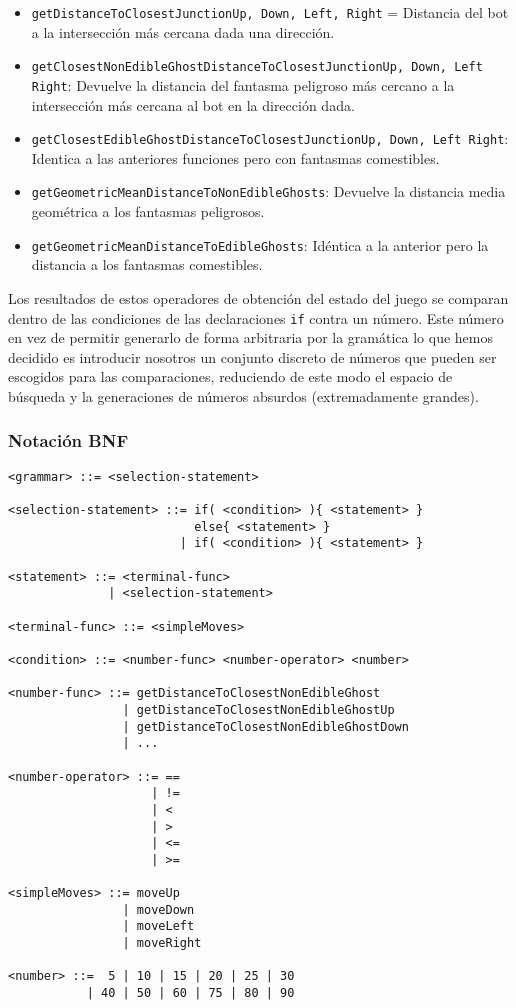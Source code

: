 \begin{itemize}
\item \texttt{getDistanceToClosestJunction{Up, Down, Left, Right}} = Distancia del bot a la intersección más cercana dada una dirección.

\item \texttt{getClosestNonEdibleGhostDistanceToClosestJunction{Up, Down, Left Right}}: Devuelve la distancia del fantasma peligroso más cercano a la intersección más cercana al bot en la dirección dada.

\item \texttt{getClosestEdibleGhostDistanceToClosestJunction{Up, Down, Left Right}}: Identica a las anteriores funciones pero con fantasmas comestibles.

\item \texttt{getGeometricMeanDistanceToNonEdibleGhosts}: Devuelve la distancia media geométrica a los fantasmas peligrosos.

\item \texttt{getGeometricMeanDistanceToEdibleGhosts}: Idéntica a la anterior pero la distancia a los fantasmas comestibles.
\end{itemize}

Los resultados de estos operadores de obtención del estado del juego se comparan dentro de las condiciones de las declaraciones \texttt{if} contra un número. Este número en vez de permitir generarlo de forma arbitraria por la gramática lo que hemos decidido es introducir nosotros un conjunto discreto de números que pueden ser escogidos para las comparaciones, reduciendo de este modo el espacio de búsqueda y la generaciones de números absurdos (extremadamente grandes).

\subsubsection{Notación BNF}
\begin{lstlisting}[caption={Gramática de bajo nivel.}]
<grammar> ::= <selection-statement>
 
<selection-statement> ::= if( <condition> ){ <statement> }
                          else{ <statement> }
                        | if( <condition> ){ <statement> }
 
<statement> ::= <terminal-func>
              | <selection-statement>
 
<terminal-func> ::= <simpleMoves>
 
<condition> ::= <number-func> <number-operator> <number>
 
<number-func> ::= getDistanceToClosestNonEdibleGhost
                | getDistanceToClosestNonEdibleGhostUp
                | getDistanceToClosestNonEdibleGhostDown
                | ... 
 
<number-operator> ::= ==
                    | !=
                    | <
                    | >
                    | <=
                    | >=
 
<simpleMoves> ::= moveUp
                | moveDown
                | moveLeft
                | moveRight
 
<number> ::=  5 | 10 | 15 | 20 | 25 | 30
           | 40 | 50 | 60 | 75 | 80 | 90
\end{lstlisting}

